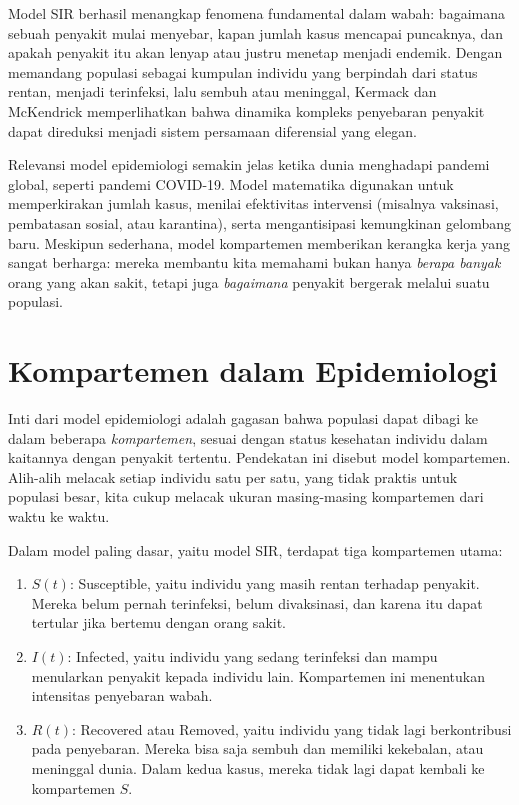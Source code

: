 \documentclass{bukumjh}
\begin{document}
Model SIR berhasil menangkap fenomena fundamental dalam wabah: bagaimana sebuah penyakit mulai menyebar, kapan jumlah kasus mencapai puncaknya, dan apakah penyakit itu akan lenyap atau justru menetap menjadi endemik. Dengan memandang populasi sebagai kumpulan individu yang berpindah dari status rentan, menjadi terinfeksi, lalu sembuh atau meninggal, Kermack dan McKendrick memperlihatkan bahwa dinamika kompleks penyebaran penyakit dapat direduksi menjadi sistem persamaan diferensial yang elegan.

Relevansi model epidemiologi semakin jelas ketika dunia menghadapi pandemi global, seperti pandemi COVID-19. Model matematika digunakan untuk memperkirakan jumlah kasus, menilai efektivitas intervensi (misalnya vaksinasi, pembatasan sosial, atau karantina), serta mengantisipasi kemungkinan gelombang baru. Meskipun sederhana, model kompartemen memberikan kerangka kerja yang sangat berharga: mereka membantu kita memahami bukan hanya \emph{berapa banyak} orang yang akan sakit, tetapi juga \emph{bagaimana} penyakit bergerak melalui suatu populasi.

\section{Kompartemen dalam Epidemiologi}

Inti dari model epidemiologi adalah gagasan bahwa populasi dapat dibagi ke dalam beberapa \textit{kompartemen}, sesuai dengan status kesehatan individu dalam kaitannya dengan penyakit tertentu. Pendekatan ini disebut {\jsg model kompartemen}. Alih-alih melacak setiap individu satu per satu, yang tidak praktis untuk populasi besar, kita cukup melacak ukuran masing-masing kompartemen dari waktu ke waktu. 

Dalam model paling dasar, yaitu model SIR, terdapat tiga kompartemen utama:
\begin{enumerate}
    \item $S(t)$: {\jsg Susceptible}, yaitu individu yang masih rentan terhadap penyakit. Mereka belum pernah terinfeksi, belum divaksinasi, dan karena itu dapat tertular jika bertemu dengan orang sakit.
    \item $I(t)$: {\jsg Infected}, yaitu individu yang sedang terinfeksi dan mampu menularkan penyakit kepada individu lain. Kompartemen ini menentukan intensitas penyebaran wabah.
    \item $R(t)$: {\jsg Recovered} atau {\jsg Removed}, yaitu individu yang tidak lagi berkontribusi pada penyebaran. Mereka bisa saja sembuh dan memiliki kekebalan, atau meninggal dunia. Dalam kedua kasus, mereka tidak lagi dapat kembali ke kompartemen $S$.
\end{enumerate}
\end{document}
